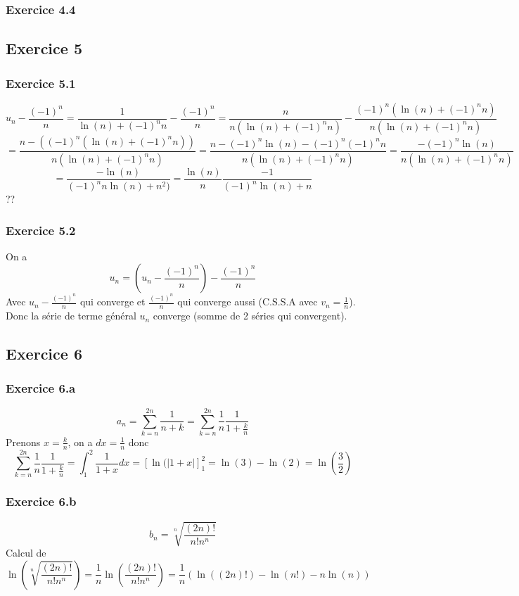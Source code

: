 \documentclass[]{book}
\theoremstyle{definition}
\begin{document}
\subsubsection*{Exercice 4.4}

\subsection*{Exercice 5}
\subsubsection*{Exercice 5.1}
$$u_n - \frac{(-1)^n}{n} = \frac{1}{\ln(n)+(-1)^{n}n} - \frac{(-1)^n}{n} = \frac{n}{n(\ln(n)+(-1)^{n}n)} - \frac{(-1)^n(\ln(n)+(-1)^{n}n)}{n(\ln(n)+(-1)^{n}n)}$$
$$=\frac{n-((-1)^n(\ln(n)+(-1)^{n}n))}{n(\ln(n)+(-1)^{n}n)} = \frac{n-(-1)^n\ln(n)-(-1)^{n}(-1)^{n}n}{n(\ln(n)+(-1)^{n}n)} = \frac{-(-1)^n\ln(n)}{n(\ln(n)+(-1)^{n}n)}$$
$$=\frac{-\ln(n)}{(-1)^{n}n\ln(n)+n^2)} = \frac{\ln(n)}{n}\frac{-1}{(-1)^{n}\ln(n)+n}$$
??

\subsubsection*{Exercice 5.2}
On a 
$$u_n = \left( u_n - \frac{(-1)^n}{n} \right) - \frac{(-1)^n}{n}$$
Avec $u_n - \frac{(-1)^n}{n}$ qui converge et $\frac{(-1)^n}{n}$ qui converge aussi (C.S.S.A avec $v_n = \frac{1}{n}$). Donc la s\'erie de terme g\'en\'eral $u_n$ converge (somme de 2 s\'eries qui convergent). 


\subsection*{Exercice 6}
\subsubsection*{Exercice 6.a}
$$a_n = \sum_{k=n}^{2n}\frac{1}{n+k} = \sum_{k=n}^{2n}\frac{1}{n}\frac{1}{1+\frac{k}{n}}$$
Prenons $x=\frac{k}{n}$, on a $dx=\frac{1}{n}$ donc
$$\sum_{k=n}^{2n}\frac{1}{n}\frac{1}{1+\frac{k}{n}} = \int_{1}^{2} \frac{1}{1+x}dx = \left[\ln(|1+x|\right]_{1}^{2} = \ln(3)-\ln(2) = \ln(\frac{3}{2})$$

\subsubsection*{Exercice 6.b}
$$b_n = \sqrt[n]{\frac{(2n)!}{n!n^n}}$$
Calcul de 
$$\ln\left(\sqrt[n]{\frac{(2n)!}{n!n^n}}\right) = \frac{1}{n}\ln\left(\frac{(2n)!}{n!n^n}\right) = \frac{1}{n}(\ln((2n)!)-\ln(n!)-n\ln(n))$$
\end{document}
